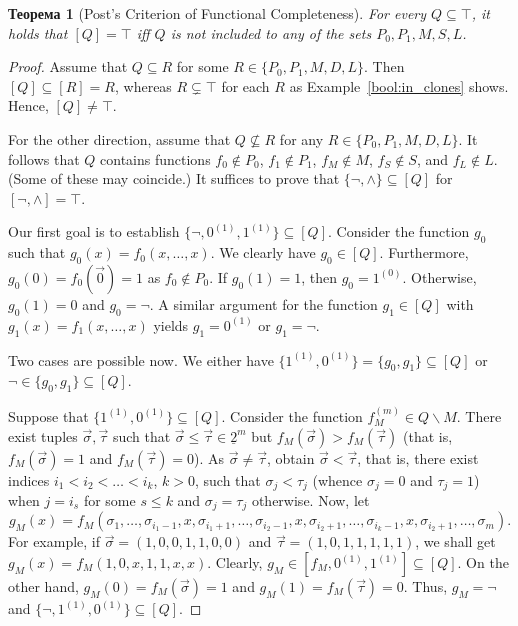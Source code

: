\documentclass[12pt,notitlepage]{article}
\theoremstyle{plain}
\newtheorem{thm}{Теорема}[section]
\theoremstyle{definition}
\theoremstyle{plain}
\newcommand{\sbs}{\subseteq}
\renewcommand{\setminus}{\smallsetminus}
\newcommand{\ul}[1]{\underline{#1}}
\newcommand{\1}{\mathbf{1}}
\newcommand{\0}{\mathbf{0}}
\begin{document}
\begin{thm}[Post's Criterion of Functional Completeness]\label{bool:post}
	For every $Q \sbs \top$, it holds that $[Q] = \top$ iff $Q$ is \emph{not included} to any of the sets $P_0, P_1, M, S, L$.
\end{thm}
\begin{proof}
	Assume that $Q \sbs R$ for some $R \in \{P_0, P_1, M, D, L\}$. Then $[Q] \sbs [R] = R$, whereas $R  \subsetneq \top$ for each $R$ as Example~\ref{bool:in_clones} shows. Hence, $[Q] \neq \top$.
	
	For the other direction, assume that $Q \not\sbs R$ for any $R \in \{P_0, P_1, M, D, L\}$. It follows that $Q$ contains functions $f_0 \notin P_0$, $f_1 \notin P_1$, $f_M \notin M$, $f_S \notin S$, and $f_L \notin L$. (Some of these may coincide.) It suffices to prove that $\{{\neg}, {\wedge} \} \sbs [Q]$ for $[{\neg}, {\wedge} ] = \top$.
	
	Our first goal is to establish $\{{\neg}, 0^{(1)}, 1^{(1)} \} \sbs [Q]$. Consider the function $g_0$ such that $g_0(x) = f_{0}(x, \ldots, x)$. We clearly have $g_0 \in [Q]$. Furthermore, $g_0(0) = f_0(\vec 0) = 1$ as $f_0 \notin P_{0}$. If $g_0(1) = 1$, then $g_0 = 1^{(0)}$. Otherwise, $g_0(1) = 0$ and $g_0 = {\neg}$. A similar argument for the function $g_1 \in [Q]$ with $g_1(x) = f_{1}(x, \ldots, x)$ yields $g_1 = 0^{(1)}$ or $g_1 = {\neg}$.
	
	Two cases are possible now. We either have $\{1^{(1)}, 0^{(1)}\} = \{g_0, g_1\} \sbs [Q]$ or ${\neg} \in \{g_0, g_1\} \sbs [Q]$.
	
	Suppose that $\{1^{(1)}, 0^{(1)}\} \sbs [Q]$. Consider the function $f^{(m)}_M \in Q \setminus M$. There exist tuples $\vec\sigma, \vec\tau$ such that $\vec \sigma \leq \vec \tau \in \ul{2}^m$ but $f_M(\vec\sigma) > f_M(\vec\tau)$ (that is, $f_M(\vec \sigma) = 1$ and $f_M(\vec{\tau}) = 0$). As $\vec \sigma \neq \vec \tau$, obtain $\vec \sigma < \vec \tau$, that is, there exist indices $i_1 <  i_2 < \ldots < i_k$, $k > 0$, such that $\sigma_j < \tau_j$ (whence $\sigma_j = 0$ and $\tau_j = 1$) when $j = i_s$ for some $s \leq k$ and $\sigma_j = \tau_j$ otherwise. Now, let
	$$g_M(x) = f_M(\sigma_1, \ldots, \sigma_{i_1 - 1}, x, \sigma_{i_1 + 1}, \ldots, \sigma_{i_2 - 1}, x,  \sigma_{i_2 + 1}, \ldots, \sigma_{i_k - 1}, x,  \sigma_{i_2 + 1}, \ldots, \sigma_m).$$
	For example, if $\vec\sigma = (1,0,0,1,1,0,0)$ and $\vec\tau = (1,0,1,1,1,1,1)$, we shall get $g_M(x) = f_M(1, 0, x, 1, 1, x, x)$. Clearly, $g_M \in [f_M, 0^{(1)}, 1^{(1)}] \sbs [Q]$. On the other hand, $g_M(0) = f_M(\vec\sigma) = 1$ and $g_M(1) = f_M(\vec{\tau}) = 0$. Thus, $g_M = {\neg}$ and $\{{\neg}, 1^{(1)}, 0^{(1)}\} \sbs [Q]$.
	

\end{proof}
\end{document}
